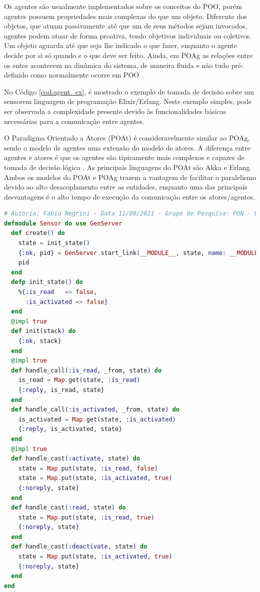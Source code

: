 Os agentes são usualmente implementados sobre os conceitos do POO, porém agentes
possuem propriedades mais complexas do que um objeto. Diferente dos objetos, que
atuam passivamente até que um de seus métodos sejam invocados, agentes podem
atuar de forma proativa, tendo objetivos individuais ou coletivos. Um objeto
aguarda até que seja lhe indicado o que fazer, enquanto o agente decide por si
só quando e o que deve ser feito. Ainda, em POAg as relações entre os entes
acontecem na dinâmica do sistema, de maneira fluida e não tudo pré-definido como
normalmente ocorre em POO \cite{msc_Banaszewski_2009}.

No Código \ref{cod:agent_ex}, é mostrado o exemplo de tomada de decisão sobre um
sensorem linguagem de programação Elixir/Erlang. Neste exemplo simples, pode ser
observada a complexidade presente devido às funcionalidades básicas necessárias
para a comunicação entre agentes.

O Paradigma Orientado a Atores (POAt) é consideravelmente similar ao POAg, sendo
o modelo de agentes uma extensão do modelo de atores. A diferença entre agentes
e atores é que os agentes são tipicamente mais complexos e capazes de tomada de
decisão lógica \cite{cardoso_2013}. As principais linguagens do POAt são Akka e
Erlang. Ambos os modelos do POAt e POAg trazem a vantagem de facilitar o
paralelismo devido ao alto desacoplamento entre as entidades, enquanto uma das
principais desvantagens é o alto tempo de execução da comunicação entre os
atores/agentes.

\begin{lstlisting}[caption = {Exemplo de aplicação de sensor em Elixir no POAg}, %float=htb,
source = {Autoria própria}, language=elixir, float=htb,
  label = {cod:agent_ex}]
# Autoria: Fabio Negrini - Data 11/08/2021 - Grupo de Pesquisa: PON - UTFPR
defmodule Sensor do use GenServer
  def create() do
    state = init_state()
    {:ok, pid} = GenServer.start_link(__MODULE__, state, name: __MODULE__)
    pid
  end
  defp init_state() do
    %{:is_read   => false,
      :is_activated => false}
  end
  @impl true
  def init(stack) do
    {:ok, stack}
  end
  @impl true
  def handle_call(:is_read, _from, state) do
    is_read = Map.get(state, :is_read)
    {:reply, is_read, state}
  end
  def handle_call(:is_activated, _from, state) do
    is_activated = Map.get(state, :is_activated)
    {:reply, is_activated, state}
  end
  @impl true
  def handle_cast(:activate, state) do
    state = Map.put(state, :is_read, false)
    state = Map.put(state, :is_activated, true)
    {:noreply, state}
  end
  def handle_cast(:read, state) do
    state = Map.put(state, :is_read, true)
    {:noreply, state}
  end
  def handle_cast(:deactivate, state) do
    state = Map.put(state, :is_activated, true)
    {:noreply, state}
  end
end
\end{lstlisting}

